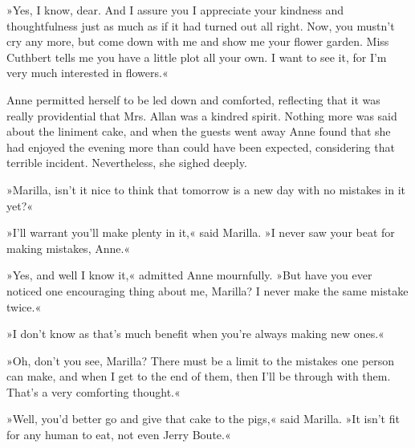 »Yes, I know, dear. And I assure you I appreciate your kindness and thoughtfulness just as much as if it had turned out all right. Now, you mustn’t cry any more, but come down with me and show me your flower garden. Miss Cuthbert tells me you have a little plot all your own. I want to see it, for I’m very much interested in flowers.«

Anne permitted herself to be led down and comforted, reflecting that it was really providential that Mrs. Allan was a kindred spirit. Nothing more was said about the liniment cake, and when the guests went away Anne found that she had enjoyed the evening more than could have been expected, considering that terrible incident. Nevertheless, she sighed deeply.

»Marilla, isn’t it nice to think that tomorrow is a new day with no mistakes in it yet?«

»I’ll warrant you’ll make plenty in it,« said Marilla. »I never saw your beat for making mistakes, Anne.«

»Yes, and well I know it,« admitted Anne mournfully. »But have you ever noticed one encouraging thing about me, Marilla? I never make the same mistake twice.«

»I don’t know as that’s much benefit when you’re always making new ones.«

»Oh, don’t you see, Marilla? There must be a limit to the mistakes one person can make, and when I get to the end of them, then I’ll be through with them. That’s a very comforting thought.«

»Well, you’d better go and give that cake to the pigs,« said Marilla. »It isn’t fit for any human to eat, not even Jerry Boute.«